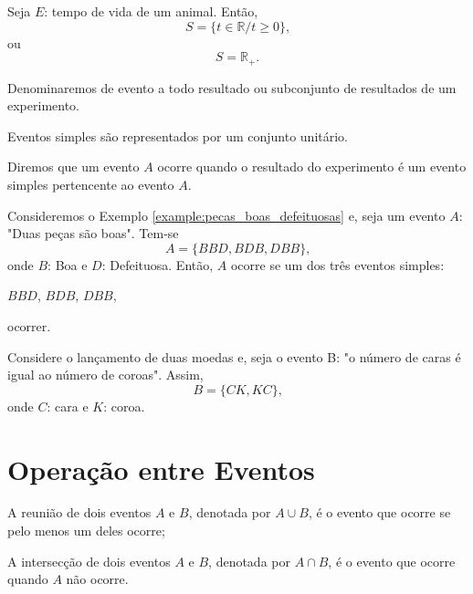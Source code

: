 \documentclass[11pt,fleqn]{book}
\numberwithin{mpicture}{chapter}
\numberwithin{mtable}{chapter}
\numberwithin{mframe}{chapter}
\begin{document}
\begin{example}
	Seja $E$: tempo de vida de um animal. Então,
	\[
		S=\{t\in\mathbb{R}/ t\geqslant 0\}\text{,}
	\]
	ou
	\[
		S=\mathbb{R}_{+}\text{.}
	\]
\end{example}

\begin{definition}
	Denominaremos de evento a todo resultado ou subconjunto de resultados de um experimento.
\end{definition}

\begin{remark}
	Eventos simples são representados por um conjunto unitário.
\end{remark}

\begin{remark}
	Diremos que um evento $A$ ocorre quando o resultado do experimento é um evento simples pertencente ao evento $A$.
\end{remark}

\begin{example}
	Consideremos o Exemplo \ref{example:pecas_boas_defeituosas} e, seja um evento $A$: "Duas peças são boas". Tem-se
	\[
		A=\{BBD, BDB, DBB\}\text{,}
	\]
	onde $B$: Boa e $D$: Defeituosa. Então, $A$ ocorre se um dos três eventos simples:
	\begin{center}
		$BBD$, $BDB$, $DBB$,
	\end{center}
	ocorrer.
\end{example}

\begin{example}
	Considere o lançamento de duas moedas e, seja o evento B: "o número de caras é igual ao número de coroas". Assim,
	\[
		B=\{CK, KC\}\text{,}
	\]
	onde $C$: cara e $K$: coroa.
\end{example}

\section{Operação entre Eventos}

\begin{definition}
	\label{def:reuniao_dois_eventos}
	A reunião de dois eventos $A$ e $B$, denotada por $A\cup B$, é o evento que ocorre se pelo menos um deles ocorre;
\end{definition}

\begin{definition}
	\label{def:intercecao_dois_eventos}
	A intersecção de dois eventos $A$ e $B$, denotada por $A\cap B$, é o evento que ocorre quando $A$ não ocorre.
\end{definition}
\end{document}
